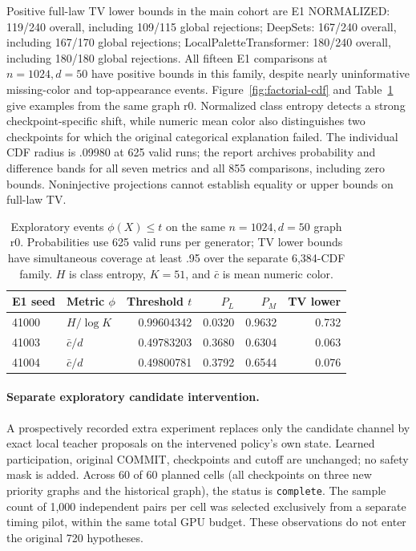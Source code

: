 Positive full-law TV lower bounds in the main cohort are E1 NORMALIZED: 119/240 overall, including 109/115 global rejections; DeepSets: 167/240 overall, including 167/170 global rejections; LocalPaletteTransformer: 180/240 overall, including 180/180 global rejections.
All fifteen E1 comparisons at $n=1024,d=50$ have positive bounds in this
family, despite nearly uninformative missing-color and top-appearance events.
Figure~\ref{fig:factorial-cdf} and Table~\ref{tab:factorial-cdf} give
examples from the same graph r0. Normalized class entropy detects a strong
checkpoint-specific shift, while numeric mean color also distinguishes two
checkpoints for which the original categorical explanation failed.
The individual CDF radius is .09980 at 625 valid runs; the report archives
probability and difference bands for all seven metrics and all 855 comparisons,
including zero bounds. Noninjective projections cannot establish equality
or upper bounds on full-law TV.
\begin{table}[t]
\centering\small
\begin{tabular}{llrrrr}
\toprule E1 seed & Metric $\phi$ & Threshold $t$ & $P_L$ & $P_M$ & TV lower\\
\midrule
41000 & $H/\log K$ & 0.99604342 & 0.0320 & 0.9632 & 0.732 \\
41003 & $\bar c/d$ & 0.49783203 & 0.3680 & 0.6304 & 0.063 \\
41004 & $\bar c/d$ & 0.49800781 & 0.3792 & 0.6544 & 0.076 \\
\bottomrule
\end{tabular}
\caption{Exploratory events $\phi(X)\le t$ on the same $n=1024,d=50$
graph r0. Probabilities use 625 valid runs per generator; TV lower bounds
have simultaneous coverage at least .95 over the separate 6,384-CDF family.
$H$ is class entropy, $K=51$, and $\bar c$ is mean numeric color.}
\label{tab:factorial-cdf}
\end{table}

\paragraph{Separate exploratory candidate intervention.}
A prospectively recorded extra experiment replaces only the candidate
channel by exact local teacher proposals on the intervened policy's own
state. Learned participation, original COMMIT, checkpoints and cutoff are
unchanged; no safety mask is added. Across 60 of 60 planned cells
(all checkpoints on three new priority graphs and the historical graph),
the status is \texttt{complete}.
The sample count of 1,000 independent pairs per cell was selected exclusively
from a separate timing pilot, within the same total GPU budget. These observations do not enter the
original 720 hypotheses.

